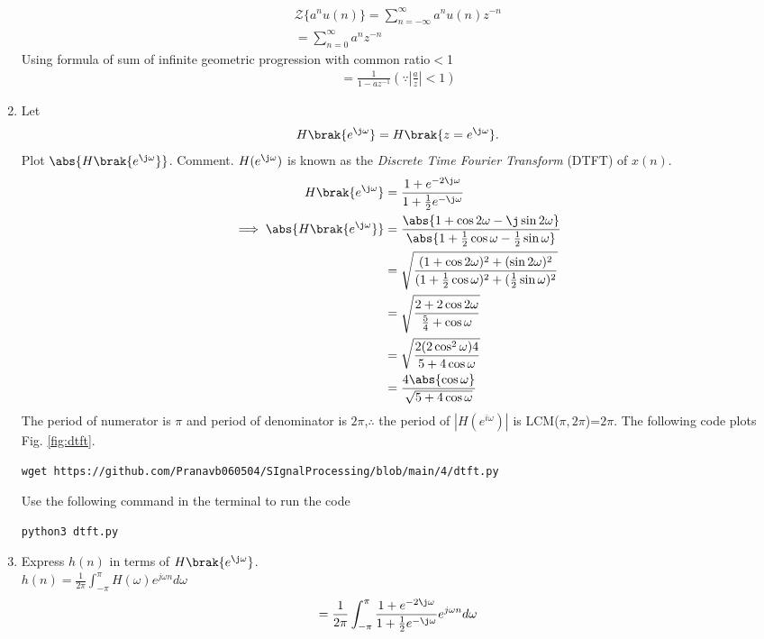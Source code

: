 \documentclass[journal,12pt,twocolumn]{IEEEtran}
\renewcommand\thesection{\arabic{section}}
\begin{document}
\begin{enumerate}[label=\thesection.\arabic*]
\begin{align}
{\mathcal {Z}}\{a^{n}u(n)\}=\sum_{n=-\infty}^{\infty} a^{n}u(n) z^{-n}\\
=\sum_{n=0}^{\infty}a^{n}z^{-n}
\end{align}
Using formula of  sum of infinite geometric progression with common ratio$<$1
\begin{align}
=\frac{1}{1-a z^{-1}} \left(\because \left|\frac{a}{z}\right|<1\right)
\end{align} 
\item 
Let
\begin{equation}
H\brak{e^{\j \omega}} = H\brak{z = e^{\j \omega}}.
\end{equation}
Plot $\abs{H\brak{e^{\j \omega}}}$.  Comment.  $H(e^{\j \omega})$ is
known as the {\em Discrete Time Fourier Transform} (DTFT) of $x(n)$.
\\
\solution
\begin{align}
		H\brak{e^{\j \omega}} &= \frac{1 + e^{-2\j\omega}}{1 + \frac12 e^{-\j\omega}} \\
		\implies \abs{H\brak{e^{\j \omega}}} &= \frac{\abs{1 + \cos2\omega - \j\sin2\omega}}{\abs{1 + \frac12 \cos\omega - \frac12 \sin\omega}} \\
		&= \sqrt{\frac{(1 + \cos2\omega)^2 + (\sin2\omega)^2}{(1 + \frac12 \cos\omega)^2 + (\frac12 \sin\omega)^2}} \\
		&= \sqrt{\frac{2 + 2\cos2\omega}{\frac54 + \cos\omega}} \\
		&= \sqrt{\frac{2(2\cos^2\omega)4}{5 + 4\cos\omega} } \\
		&= \frac{4\abs{\cos\omega}}{\sqrt{5 + 4\cos\omega}}
	\end{align} 
The period of numerator is $\pi$  and period of denominator is $2 \pi$,$\therefore$ the period of $|H(e^{i \omega})|$ is LCM($\pi,2 \pi$)=$2\pi$. The following code plots Fig. \ref{fig:dtft}.
\begin{lstlisting}
wget https://github.com/Pranavb060504/SIgnalProcessing/blob/main/4/dtft.py
\end{lstlisting}
Use the following command in the terminal to run the code
\begin{lstlisting}
python3 dtft.py
\end{lstlisting}
\item Express $h(n)$ in terms of $H\brak{e^{\j \omega}}$.\\
\solution
$h(n)=\frac{1}{2 \pi} \int_{-\pi}^{\pi} H(\omega) e^{j \omega n} d \omega$\\
 \begin{align}
 =\frac{1}{2 \pi} \int_{-\pi}^{\pi} \frac{1 + e^{-2\j\omega}}{1 + \frac12 e^{-\j\omega}} e^{j \omega n} d\omega\\
 \end{align}
\end{enumerate}
\end{document}
